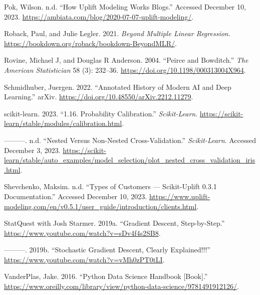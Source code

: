 \documentclass[
  letterpaper,
]{krantz}
\newlength{\cslhangindent}
\newlength{\cslentryspacingunit} %
\newenvironment{CSLReferences}[2] %
 {%
  \setlength{\parindent}{0pt}
  \ifodd #1
  \let\oldpar\par
  \def\par{\hangindent=\cslhangindent\oldpar}
  \fi
  \setlength{\parskip}{#2\cslentryspacingunit}
 }%
 {}
\begin{document}
\begin{CSLReferences}{1}{0}
\leavevmode{}%
Pok, Wilson. n.d. {``How Uplift Modeling Works {\textbar} {Blogs}.''}
Accessed December 10, 2023.
\url{https://ambiata.com/blog/2020-07-07-uplift-modeling/}.

\leavevmode{}%
Roback, Paul, and Julie Legler. 2021. \emph{Beyond {Multiple} {Linear}
{Regression}}. \url{https://bookdown.org/roback/bookdown-BeyondMLR/}.

\leavevmode{}%
Rovine, Michael J, and Douglas R Anderson. 2004. {``Peirce and
{Bowditch}.''} \emph{The American Statistician} 58 (3): 232--36.
\url{https://doi.org/10.1198/000313004X964}.

\leavevmode{}%
Schmidhuber, Juergen. 2022. {``Annotated {History} of {Modern} {AI} and
{Deep} {Learning}.''} arXiv.
\url{https://doi.org/10.48550/arXiv.2212.11279}.

\leavevmode{}%
scikit-learn. 2023. {``1.16. {Probability} Calibration.''}
\emph{Scikit-Learn}.
\url{https://scikit-learn/stable/modules/calibration.html}.

\leavevmode{}%
---------. n.d. {``Nested Versus Non-Nested Cross-Validation.''}
\emph{Scikit-Learn}. Accessed December 3, 2023.
\url{https://scikit-learn/stable/auto_examples/model_selection/plot_nested_cross_validation_iris.html}.

\leavevmode{}%
Shevchenko, Maksim. n.d. {``Types of Customers --- Scikit-Uplift 0.3.1
Documentation.''} Accessed December 10, 2023.
\url{https://www.uplift-modeling.com/en/v0.5.1/user_guide/introduction/clients.html}.

\leavevmode{}%
StatQuest with Josh Starmer. 2019a. {``Gradient {Descent},
{Step}-by-{Step}.''} \url{https://www.youtube.com/watch?v=sDv4f4s2SB8}.

\leavevmode{}%
---------. 2019b. {``Stochastic {Gradient} {Descent}, {Clearly}
{Explained}!!!''} \url{https://www.youtube.com/watch?v=vMh0zPT0tLI}.

\leavevmode{}%
VanderPlas, Jake. 2016. {``Python {Data} {Science} {Handbook}
{[}{Book}{]}.''}
\url{https://www.oreilly.com/library/view/python-data-science/9781491912126/}.


\end{CSLReferences}
\end{document}
